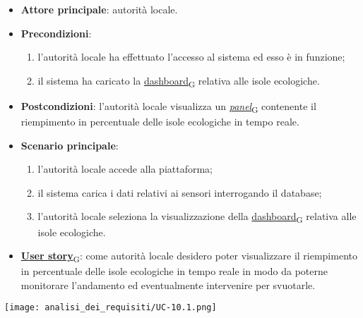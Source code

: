 \begin{itemize}
	\item \textbf{Attore principale}: autorità locale.
	\item \textbf{Precondizioni}:
	      \begin{enumerate}
		      \item l'autorità locale ha effettuato l'accesso al sistema ed esso è in funzione;
		      \item il sistema ha caricato la \href{https://7last.github.io/docs/pb/documentazione-interna/glossario\#dashboard}{dashboard\textsubscript{G}} relativa alle isole ecologiche.
	      \end{enumerate}
	\item \textbf{Postcondizioni}: l'autorità locale visualizza un \href{https://7last.github.io/docs/pb/documentazione-interna/glossario\#panel}{\textit{panel}\textsubscript{G}} contenente il riempimento in percentuale delle isole ecologiche in tempo reale.
	\item \textbf{Scenario principale}:
	      \begin{enumerate}
		      \item l'autorità locale accede alla piattaforma;
		      \item il sistema carica i dati relativi ai sensori interrogando il database;
		      \item l'autorità locale seleziona la visualizzazione della \href{https://7last.github.io/docs/pb/documentazione-interna/glossario\#dashboard}{dashboard\textsubscript{G}} relativa alle isole ecologiche.
	      \end{enumerate}
	\item \href{https://7last.github.io/docs/pb/documentazione-interna/glossario\#user-story}{\textbf{User story}\textsubscript{G}}:
	      come autorità locale desidero poter visualizzare il riempimento in percentuale delle isole ecologiche in tempo reale in modo da poterne monitorare l'andamento
	      ed eventualmente intervenire per svuotarle.
\end{itemize}
\begin{center}
	\texttt{[image: analisi\_dei\_requisiti/UC-10.1.png]}
\end{center}


